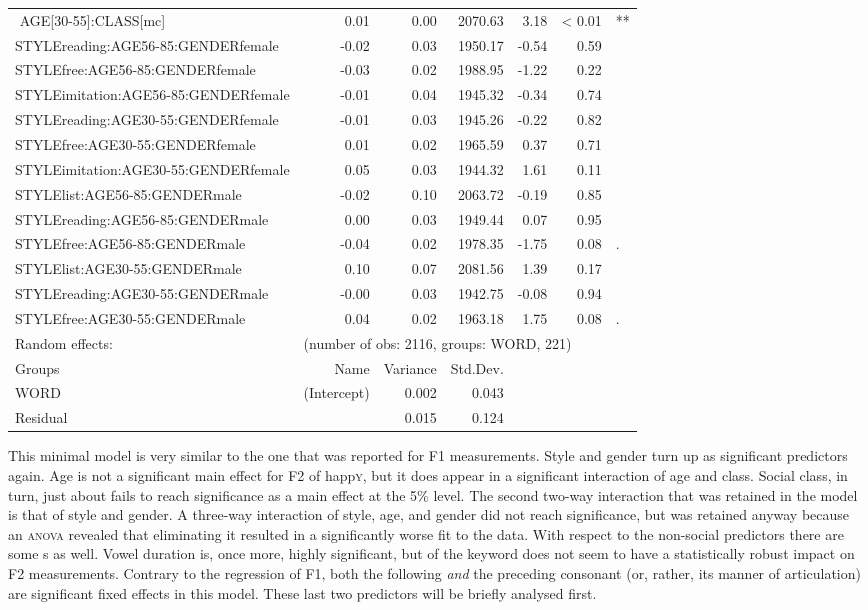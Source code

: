 {\begin{longtable}[c]{p{}rrrrrl}
$$		AGE[30-55]:CLASS[mc] & 0.01 & 0.00 & 2070.63 & 3.18 & < 0.01 & ** \\ 
		STYLEreading:AGE56-85:GENDERfemale & -0.02 & 0.03 & 1950.17 & -0.54 & 0.59 & \\ 
		STYLEfree:AGE56-85:GENDERfemale & -0.03 & 0.02 & 1988.95 & -1.22 & 0.22 & \\ 
		STYLEimitation\is{accent performance}:AGE56-85:GENDERfemale & -0.01 & 0.04 & 1945.32 & -0.34 & 0.74 & \\ 
		STYLEreading:AGE30-55:GENDERfemale & -0.01 & 0.03 & 1945.26 & -0.22 & 0.82 & \\ 
		STYLEfree:AGE30-55:GENDERfemale & 0.01 & 0.02 & 1965.59 & 0.37 & 0.71 & \\ 
		STYLEimitation\is{accent performance}:AGE30-55:GENDERfemale & 0.05 & 0.03 & 1944.32 & 1.61 & 0.11 & \\ 
		STYLElist:AGE56-85:GENDERmale & -0.02 & 0.10 & 2063.72 & -0.19 & 0.85 & \\ 
		STYLEreading:AGE56-85:GENDERmale & 0.00 & 0.03 & 1949.44 & 0.07 & 0.95 & \\ 
		STYLEfree:AGE56-85:GENDERmale & -0.04 & 0.02 & 1978.35 & -1.75 & 0.08 & .\\ 
		STYLElist:AGE30-55:GENDERmale & 0.10 & 0.07 & 2081.56 & 1.39 & 0.17 & \\ 
		STYLEreading:AGE30-55:GENDERmale & -0.00 & 0.03 & 1942.75 & -0.08 & 0.94 & \\ 
		STYLEfree:AGE30-55:GENDERmale & 0.04 & 0.02 & 1963.18 & 1.75 & 0.08 & .\\ 
		\hline
		Random effects: & \multicolumn{6}{l}{(number of obs: 2116, groups: WORD, 221)} \\
		Groups &         Name & Variance &      Std.Dev. & & & \\
		WORD &  (Intercept) & 0.002 & 0.043 & & & \\
		Residual  &         & 0.015 & 0.124 & & & \\
		\hline
	\end{longtable}
}

This minimal model is very similar to the one that was reported for F1 measurements.
Style and gender turn up as significant predictors again.
Age is not a significant main effect for F2 of happ\textsc{y}, but it does appear in a significant interaction of age and class.
Social class, in turn, just about fails to reach significance as a main effect at the 5\% level.
The second two-way interaction that was retained in the model is that of style and gender.
A three-way interaction of style, age, and gender did not reach significance, but was retained anyway because an \textsc{anova} revealed that eliminating it resulted in a significantly worse fit to the data.
With respect to the non-social predictors there are some s as well.
Vowel duration is, once more, highly significant, but  of the keyword does not seem to have a statistically robust impact on F2 measurements.
Contrary to the regression of F1, both the following \emph{and} the preceding consonant (or, rather, its manner of articulation) are significant fixed effects in this model.
These last two predictors will be briefly analysed first.

